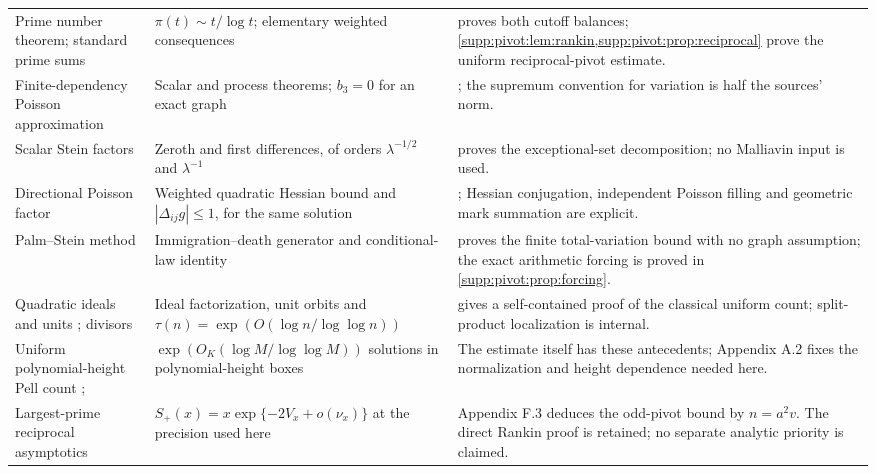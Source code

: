 \begin{longtable}{@{}L{.205\textwidth}L{.30\textwidth}L{.435\textwidth}@{}}
Prime number theorem; standard prime sums \cite{Tenenbaum2015}
& $\pi(t)\sim t/\log t$; elementary weighted consequences
&  proves both cutoff balances; \cref{supp:pivot:lem:rankin,supp:pivot:prop:reciprocal} prove the uniform reciprocal-pivot estimate.\\
Finite-dependency Poisson approximation \cite{ArratiaGoldsteinGordon1989,ArratiaGoldsteinGordon1990}
& Scalar and process theorems; $b_3=0$ for an exact graph
& ; the supremum convention for variation is half the sources' norm.\\
Scalar Stein factors \cite[(2.15)]{Krokowski2017}
& Zeroth and first differences, of orders $\lambda^{-1/2}$ and $\lambda^{-1}$
&  proves the exceptional-set decomposition; no Malliavin input is used.\\
Directional Poisson factor \cite[p.~179, Lemmas~2--3]{Barbour1988SteinProcess}
& Weighted quadratic Hessian bound and $|\Delta_{ij}g|\le1$, for the same solution
& ; Hessian conjugation, independent Poisson filling and geometric mark summation are explicit.\\
Palm--Stein method \cite{Barbour1988SteinProcess,ChenXia2004}
& Immigration--death generator and conditional-law identity
&  proves the finite total-variation bound with no graph assumption; the exact arithmetic forcing is proved in \cref{supp:pivot:prop:forcing}.\\
Quadratic ideals and units \cite{HalterKoch2013}; divisors \cite{NicolasRobin1983}
& Ideal factorization, unit orbits and $\tau(n)=\exp(O(\log n/\log\log n))$
&  gives a self-contained proof of the classical uniform count; split-product localization is internal.\\
Uniform polynomial-height Pell count \cite[arXiv text, Lemma~4]{CillerueloGaraev2011}; \cite[Lemma~2.10, Remark~2.12]{Tao2026}
& $\exp(O_K(\log M/\log\log M))$ solutions in polynomial-height boxes
& The estimate itself has these antecedents; Appendix A.2 fixes the normalization and height dependence needed here.\\
Largest-prime reciprocal asymptotics \cite[eq.~(1.3)]{ErdosIvicPomerance1986}
& $S_+(x)=x\exp\{-2V_x+o(\nu_x)\}$ at the precision used here
& Appendix F.3 deduces the odd-pivot bound by $n=a^2v$. The direct Rankin proof is retained; no separate analytic priority is claimed.\\

\end{longtable}
